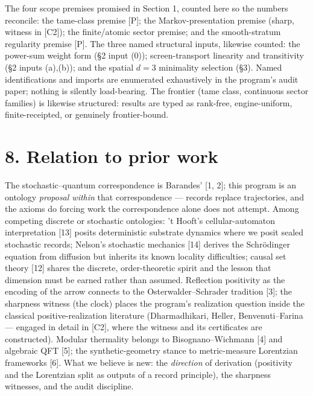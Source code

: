 \documentclass[11pt]{article}
\begin{document}
The four scope premises promised in Section 1, counted here so the numbers reconcile: the tame-class premise [P]; the Markov-presentation premise (sharp, witness in [C2]); the finite/atomic sector premise; and the smooth-stratum regularity premise [P].  The three named structural inputs, likewise counted: the power-sum weight form (§2 input (0)); screen-transport linearity and transitivity (§2 inputs (a),(b)); and the spatial $d = 3$ minimality selection (§3). Named identifications and imports are enumerated exhaustively in the program's audit paper; nothing is silently load-bearing.  The frontier (tame class, continuous sector families) is likewise structured: results are typed as rank-free, engine-uniform, finite-receipted, or genuinely frontier-bound.

\section*{8. Relation to prior work}
The stochastic–quantum correspondence is Barandes' [1, 2]; this program is an ontology \emph{proposal within} that correspondence — records replace trajectories, and the axioms do forcing work the correspondence alone does not attempt.  Among competing discrete or stochastic ontologies: 't Hooft's cellular-automaton interpretation [13] posits deterministic substrate dynamics where we posit sealed stochastic records; Nelson's stochastic mechanics [14] derives the Schrödinger equation from diffusion but inherits its known locality difficulties; causal set theory [12] shares the discrete, order-theoretic spirit and the lesson that dimension must be earned rather than assumed.  Reflection positivity as the encoding of the arrow connects to the Osterwalder–Schrader tradition [3]; the sharpness witness (the clock) places the program's realization question inside the classical positive-realization literature (Dharmadhikari, Heller, Benvenuti–Farina — engaged in detail in [C2], where the witness and its certificates are constructed). Modular thermality belongs to Bisognano–Wichmann [4] and algebraic QFT [5]; the synthetic-geometry stance to metric-measure Lorentzian frameworks [6].  What we believe is new: the \emph{direction} of derivation (positivity and the Lorentzian split as outputs of a record principle), the sharpness witnesses, and the audit discipline.
\end{document}

